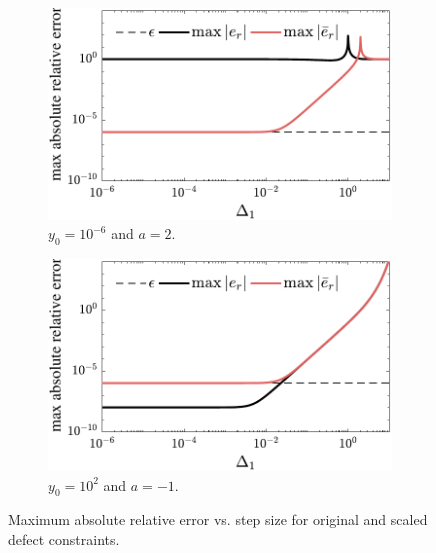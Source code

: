 \begin{figure}
\centering
\begin{subfigure}[b]{0.5\textwidth}
    \centering
    \includegraphics[width=\textwidth]{../ch4/figures/dt_errors_1}
    \caption{$y_0 = 10^{-6}$ and $a = 2$.\label{fig:ch4:dt_errors_1}}
\end{subfigure}%
\begin{subfigure}[b]{0.5\textwidth}
    \centering
    \includegraphics[width=\textwidth]{../ch4/figures/dt_errors_2}
    \caption{$y_0=10^2$ and $a=-1$.\label{fig:ch4:dt_errors_2}}
\end{subfigure}
\caption[Maximum absolute relative error vs. step size for defect constraints]{Maximum absolute relative error vs. step size for original and scaled defect constraints.\label{fig:ch4:dt_errors}}
\end{figure}
